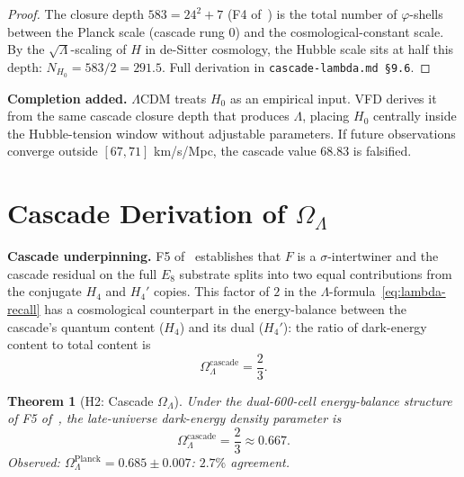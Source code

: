 \documentclass[12pt]{article}
\newtheorem{theorem}{Theorem}
\theoremstyle{definition}
\theoremstyle{remark}
\begin{document}
\begin{proof}
The closure depth $583 = 24^2 + 7$ (F4 of~\citep{SmartXXXVI}) is the total number of $\varphi$-shells between the Planck scale (cascade rung $0$) and the cosmological-constant scale. By the $\sqrt{\Lambda}$-scaling of $H$ in de-Sitter cosmology, the Hubble scale sits at half this depth: $N_{H_0} = 583/2 = 291.5$. Full derivation in \texttt{cascade-lambda.md §9.6}.
\end{proof}

\textbf{Completion added.} $\Lambda$CDM treats $H_0$ as an empirical input. VFD derives it from the same cascade closure depth that produces $\Lambda$, placing $H_0$ centrally inside the Hubble-tension window without adjustable parameters. If future observations converge outside $[67, 71]$ km/s/Mpc, the cascade value $68.83$ is falsified.

\section{Cascade Derivation of $\Omega_\Lambda$}\label{sec:Omega}

\textbf{Cascade underpinning.} F5 of~\citep{SmartXXXVI} establishes that $F$ is a $\sigma$-intertwiner and the cascade residual on the full $E_8$ substrate splits into two equal contributions from the conjugate $H_4$ and $H_4'$ copies. This factor of $2$ in the $\Lambda$-formula~\eqref{eq:lambda-recall} has a cosmological counterpart in the energy-balance between the cascade's quantum content ($H_4$) and its dual ($H_4'$): the ratio of dark-energy content to total content is
\begin{equation}\label{eq:OmegaLambda-cascade}
\Omega_\Lambda^{\mathrm{cascade}} = \frac{2}{3}.
\end{equation}

\begin{theorem}[H2: Cascade $\Omega_\Lambda$]\label{thm:OmegaLambda}
Under the dual-600-cell energy-balance structure of F5 of~\citep{SmartXXXVI}, the late-universe dark-energy density parameter is
\begin{equation}
\Omega_\Lambda^{\mathrm{cascade}} = \frac{2}{3} \approx 0.667.
\end{equation}
Observed: $\Omega_\Lambda^{\mathrm{Planck}} = 0.685 \pm 0.007$: $2.7\%$ agreement.
\end{theorem}
\end{document}
